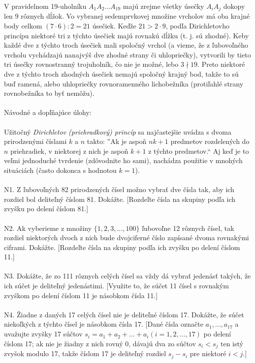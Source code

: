 V pravidelnom 19-uholníku $A_1A_2 \ldots A_{19}$ majú zrejme všetky úsečky $A_iA_j$ dokopy len 9 rôznych dĺžok. Vo vybranej sedemprvkovej množine vrcholov má oba krajné body celkom $(7 \cdot 6) : 2 = 21$ úsečiek. Keďže $21 > 2 \cdot 9$, podľa Dirichletovho princípu niektoré tri z týchto úsečiek majú rovnakú dĺžku (t. j. sú zhodné). Keby každé dve z týchto troch úsečiek mali spoločný vrchol (a vieme, že z ľubovoľného vrcholu vychádzajú nanajvýš dve zhodné strany či uhlopriečky), vytvorili by tieto tri úsečky rovnostranný trojuholník, čo nie je možné, lebo $3 \nmid  19$. Preto niektoré dve z týchto troch zhodných úsečiek nemajú spoločný krajný bod, takže to sú buď ramená, alebo uhlopriečky rovnoramenného lichobežníka (protiľahlé strany rovnobežníka to byť nemôžu).\\
\\
Návodné a dopľňajúce úlohy:\\
\\
Užitočný \textit{Dirichletov (priehradkový) princíp} sa najčastejšie uvádza s dvoma prirodzenými číslami $k$ a $n$ takto: ”Ak je aspoň $nk+1$ predmetov rozdelených do $n$ priehradiek, v niektorej z nich je aspoň $k + 1$ z týchto predmetov.“ Aj keď je to veľmi jednoduché tvrdenie (zdôvodnite ho sami), nachádza použitie v mnohých situáciách (často dokonca s hodnotou $k = 1$).\\
\\
N1. Z ľubovoľných 82 prirodzených čísel možno vybrať dve čísla tak, aby ich rozdiel bol deliteľný číslom 81. Dokážte. [Rozdeľte čísla na skupiny podľa ich zvyšku po delení číslom 81.]\\
\\
N2. Ak vyberieme z množiny $\{1, 2, 3, \ldots , 100\}$ ľubovoľne 12 rôznych čísel, tak rozdiel niektorých dvoch z nich bude dvojciferné číslo zapísané dvoma rovnakými ciframi. Dokážte. [Rozdeľte čísla na skupiny podľa ich zvyšku po delení číslom 11.]\\
\\
N3. Dokážte, že zo 111 rôznych celých čísel sa vždy dá vybrať jedenásť takých, že ich súčet je deliteľný jedenástimi. [Využite to, že súčet 11 čísel s rovnakým zvyškom po delení číslom 11 je násobkom čísla 11.]\\
\\
N4. Žiadne z daných 17 celých čísel nie je deliteľné číslom 17. Dokážte, že súčet niekoľkých z týchto čísel je násobkom čísla 17. [Dané čísla označte $a_1, \ldots, a_{17}$ a uvažujte zvyšky
17 súčtov $s_i = a_1 + a_2 + \ldots + a_i (i = 1, 2, \ldots, 17)$ po delení číslom 17; ak nie je žiadny z nich rovný 0, dávajú dva zo súčtov $s_i < s_j$ ten istý zvyšok modulo 17, takže číslom 17 je deliteľný rozdiel $s_j - s_i$ pre niektoré $i < j$.]\\
